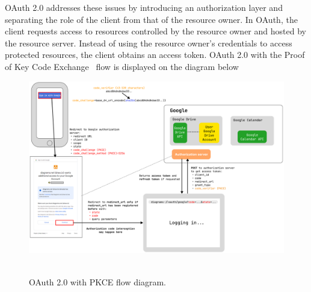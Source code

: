 %
%
%
%

OAuth 2.0 addresses these issues by introducing an authorization layer and separating the role of the client
from that of the resource owner.
In OAuth, the client requests access to resources controlled by the resource owner and hosted by the resource server.
Instead of using the resource owner's credentials to access protected resources, the client obtains an access token.
OAuth 2.0 with the Proof of Key Code Exchange~\cite{bradley2015rfc} flow is displayed on the diagram below
\begin{figure}[H]
    \centering
    \includegraphics[width=1\textwidth]{img/OAuthPkceScheme_1570_1055}
    ~\caption{OAuth 2.0 with PKCE flow diagram.}\label{fig:oauth_with_pkce}
\end{figure}

